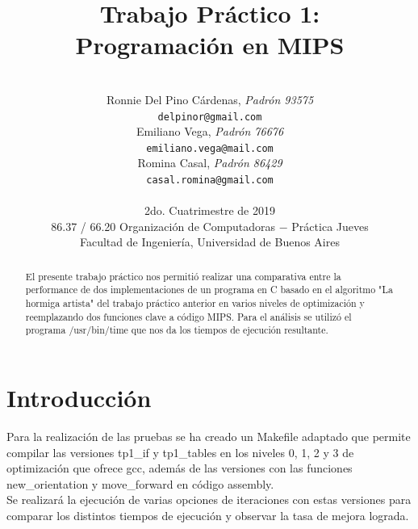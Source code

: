 \documentclass[a4paper, 10pt, twoside, notitlepage]{article}
\title{\textbf{Trabajo Práctico 1:\\Programación en MIPS} \\}
\author{ \\
         Ronnie Del Pino Cárdenas, \textit{Padrón 93575} \\
          \texttt{ delpinor@gmail.com }       \\
		  [2.5ex]
         Emiliano Vega, \textit{Padrón 76676}     \\
          \texttt{emiliano.vega@mail.com}                      \\ 
		  [2.5ex]
	 Romina Casal, \textit{Padrón 86429} \\
          \texttt{casal.romina@gmail.com}                      \\ 
		  [2.5ex]
		 \\
         \normalsize{2do. Cuatrimestre de 2019}            \\
         \normalsize{86.37 / 66.20 Organización de Computadoras $-$ Práctica Jueves} \\
         \normalsize{Facultad de Ingeniería, Universidad de Buenos Aires} 
       }
\date{}
\begin{document}
\maketitle

\begin{abstract}
El presente trabajo práctico nos permitió realizar una comparativa entre la performance de dos implementaciones de un programa en C basado en el algoritmo "La hormiga artista" del trabajo práctico anterior en varios niveles de optimización y reemplazando dos funciones clave a código MIPS. Para el análisis se utilizó el programa /usr/bin/time que nos da los tiempos de ejecución resultante.
\end{abstract}

% 
% 

\pagestyle{fancy}
\fancyhead{}
\fancyfoot{}
\renewcommand{\sectionmark}[1]{\markright{\thesection\ #1}}
\renewcommand{\headrulewidth}{0.4pt}
\fancyhead[LE]{\nouppercase \rightmark}
\fancyhead[RE, LO]{\bf \thepage}
\fancyhead[RO]{\nouppercase \rightmark}
\fancyfoot[C]{ }
\maketitle
\setcounter{page}{1}

\parskip 7.2pt
\section{Introducción}
Para la realización de las pruebas se ha creado un Makefile adaptado que permite compilar las versiones tp1\_if y tp1\_tables en los niveles 0, 1, 2 y 3 de optimización que ofrece gcc, además de las versiones con las funciones new\_orientation y move\_forward en código assembly.\\
Se realizará la ejecución de varias opciones de iteraciones con estas versiones para comparar los distintos tiempos de ejecución y observar la tasa de mejora lograda.\\

\end{document}
